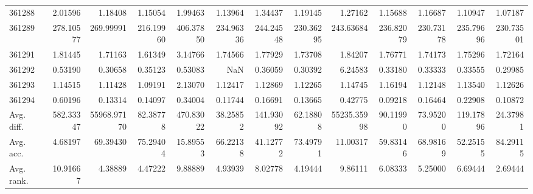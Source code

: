 \begin{tabular}{lrrrrrrrrrrrr}
361288 & 2.01596 & 1.18408 & 1.15054 & 1.99463 & 1.13964 & 1.34437 & 1.19145 & 1.27162 & 1.15688 & 1.16687 & 1.10947 & 1.07187 \\
361289 & 278.10577 & 269.99991 & 216.19960 & 406.37850 & 234.96336 & 244.24548 & 230.36295 & 243.63684 & 236.82079 & 230.73178 & 235.79696 & 230.73501 \\
361291 & 1.81445 & 1.71163 & 1.61349 & 3.14766 & 1.74566 & 1.77929 & 1.73708 & 1.84207 & 1.76771 & 1.74173 & 1.75296 & 1.72164 \\
361292 & 0.53190 & 0.30658 & 0.35123 & 0.53083 & NaN & 0.36059 & 0.30392 & 6.24583 & 0.33180 & 0.33333 & 0.33555 & 0.29985 \\
361293 & 1.14515 & 1.11428 & 1.09191 & 2.13070 & 1.12417 & 1.12869 & 1.12265 & 1.14745 & 1.16194 & 1.12148 & 1.13540 & 1.12626 \\
361294 & 0.60196 & 0.13314 & 0.14097 & 0.34004 & 0.11744 & 0.16691 & 0.13665 & 0.42775 & 0.09218 & 0.16464 & 0.22908 & 0.10872 \\
Avg. diff. & 582.33347 & 55968.97170 & 82.38778 & 470.83022 & 38.25852 & 141.93092 & 62.18808 & 55235.35998 & 90.11990 & 73.95200 & 119.17896 & 24.37981 \\
Avg. acc. & 4.68197 & 69.39430 & 75.29404 & 15.89553 & 66.22138 & 41.12772 & 73.49791 & 11.00317 & 59.83146 & 68.98169 & 52.25155 & 84.29115 \\
Avg. rank. & 10.91667 & 4.38889 & 4.47222 & 9.88889 & 4.93939 & 8.02778 & 4.19444 & 9.86111 & 6.08333 & 5.25000 & 6.69444 & 2.69444 \\
\bottomrule
\end{tabular}
